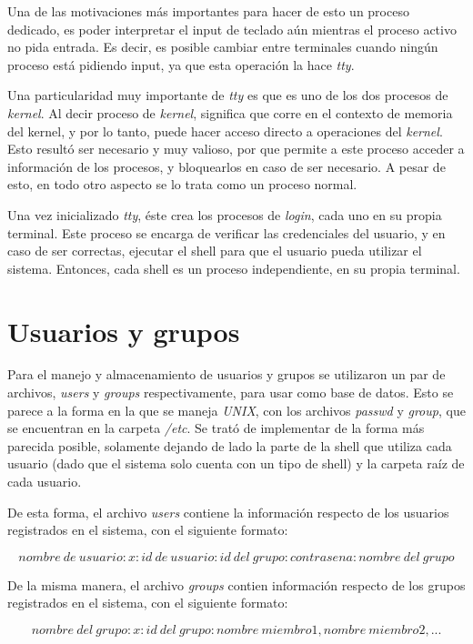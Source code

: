 \documentclass[a4paper,10pt]{article}
\begin{document}
Una de las motivaciones más importantes para hacer de esto un proceso dedicado, es poder interpretar el input de teclado aún mientras el proceso activo no pida entrada.
Es decir, es posible cambiar entre terminales cuando ningún proceso está pidiendo input, ya que esta operación la hace \textit{tty}.

Una particularidad muy importante de \textit{tty} es que es uno de los dos procesos de \textit{kernel}.
Al decir proceso de \textit{kernel}, significa que corre en el contexto de memoria del kernel, y por lo tanto, puede hacer acceso directo a operaciones del \textit{kernel}.
Esto resultó ser necesario y muy valioso, por que permite a este proceso acceder a información de los procesos, y bloquearlos en caso de ser necesario.
A pesar de esto, en todo otro aspecto se lo trata como un proceso normal.

Una vez inicializado \textit{tty}, éste crea los procesos de \textit{login}, cada uno en su propia terminal.
Este proceso se encarga de verificar las credenciales del usuario, y en caso de ser correctas, ejecutar el shell para que el usuario pueda utilizar el sistema.
Entonces, cada shell es un proceso independiente, en su propia terminal.

\newpage
\section{Usuarios y grupos}
Para el manejo y almacenamiento de usuarios y grupos se utilizaron un par de archivos, \textit{users} y \textit{groups} respectivamente, para usar como 
base de datos. Esto se parece a la forma en la que se maneja \textit{UNIX}, con los archivos \textit{passwd} y \textit{group}, que se encuentran en la carpeta
\textit{/etc}. Se trató de implementar de la forma más parecida posible, solamente dejando de lado la parte de la shell que utiliza cada usuario (dado que el sistema
solo cuenta con un tipo de shell) y la carpeta raíz de cada usuario.

De esta forma, el archivo \textit{users} contiene la información respecto de los usuarios registrados en el sistema, con el siguiente formato:

\[nombre\ de\ usuario:x: id\ de\ usuario: id\ del\ grupo: contrasena: nombre\ del\ grupo\]

De la misma manera, el archivo \textit{groups} contien información respecto de los grupos registrados en el sistema, con el siguiente formato:

\[nombre\ del\ grupo:x: id\ del\ grupo:nombre\ miembro1, nombre\ miembro2, ...\]
\end{document}
